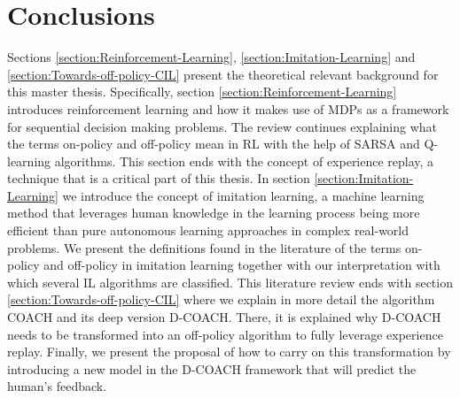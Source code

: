 \section{Conclusions}


Sections \ref{section:Reinforcement-Learning}, \ref{section:Imitation-Learning} and \ref{section:Towards-off-policy-CIL} present the theoretical relevant  background for this master thesis. Specifically, section \ref{section:Reinforcement-Learning} introduces reinforcement learning and how it makes use of MDPs as a framework for sequential decision making problems. The review continues explaining what the terms on-policy and off-policy mean in RL with the help of SARSA and Q-learning algorithms. This section ends with the concept of experience replay, a technique  that is a critical part of this thesis. In section \ref{section:Imitation-Learning} we introduce the concept of imitation learning, a machine learning method that leverages human knowledge in the learning process being more efficient than pure autonomous learning approaches in complex real-world problems. We present the definitions found in the literature of the terms on-policy and off-policy in imitation learning together with our interpretation with which several IL algorithms are classified.
This literature review ends with section \ref{section:Towards-off-policy-CIL} where we explain in more detail the algorithm COACH and its deep version D-COACH. There, it is explained why D-COACH needs to be transformed into an off-policy algorithm to fully leverage experience replay. Finally, we present the proposal of how to carry on this transformation by introducing a new model in the D-COACH framework that will predict the human's feedback.



